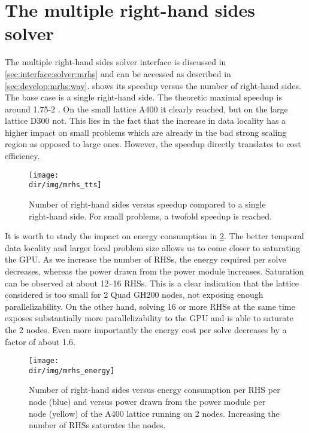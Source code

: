 \section{The multiple right-hand sides solver}
\label{sec:perf:solver:mrhs}

The multiple right-hand sides solver interface is discussed in \cref{sec:interface:solver:mrhs} and can be accessed as described in \cref{sec:develop:mrhs:way}.
 shows its speedup versus the number of right-hand sides.%
The base case is a single right-hand side.
The theoretic maximal speedup is around 1.75-2 .
On the small lattice A400 it clearly reached, but on the large lattice D300 not.
This lies in the fact that the increase in data locality has a higher impact on small problems which are already in the bad strong scaling region as opposed to large ones.
However, the speedup directly translates to cost efficiency.
\begin{figure}
    \centering
    \texttt{[image: \\dir/img/mrhs\_tts]}
    \caption{Number of right-hand sides versus speedup compared to a single right-hand side. For small problems, a twofold speedup is reached. }
    \label{fig:mrhs:tts}
\end{figure}

It is worth to study the impact on energy consumption in \cref{fig:mrhs:energy}.
The better temporal data locality and larger local problem size allows us to come closer to saturating the GPU.
As we increase the number of RHSs, the energy required per solve decreases, whereas the power drawn from the power module increases.
Saturation can be observed at about \numrange{12}{16} RHSs.
This is a clear indication that the lattice considered is too small for \num{2} Quad GH200 nodes, not exposing enough parallelizability.
On the other hand, solving \num{16} or more RHSs at the same time exposes substantially more parallelizability to the GPU and is able to saturate the \num{2} nodes.
Even more importantly the energy cost per solve decreases by a factor of about \num{1.6}.
\begin{figure}
    \centering
    \texttt{[image: \\dir/img/mrhs\_energy]}
    \caption{Number of right-hand sides versus energy consumption per RHS per node (blue) and versus power drawn from the power module per node (yellow) of the A400 lattice running on 2 nodes. Increasing the number of RHSs saturates the nodes. }
    \label{fig:mrhs:energy}
\end{figure}

